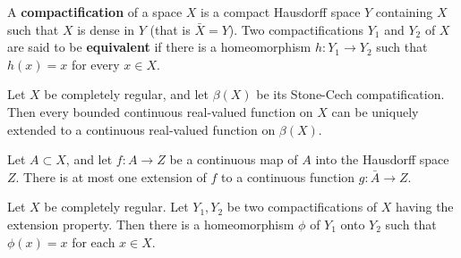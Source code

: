   \begin{definition}
    A \textbf{compactification} of a space $X$ is a compact Hausdorff space $Y$ containing $X$ such that $X$ is dense in $Y$ (that is $\bar{X} = Y$). Two compactifications $Y_1$ and $Y_2$ of $X$ are said to be \textbf{equivalent} if there is a homeomorphism $h: Y_1 \longrightarrow Y_2$ such that $h(x) = x$ for every $x \in X$. 
  \end{definition}

  \begin{theorem}
    Let $X$ be completely regular, and let $\beta(X)$ be its Stone-Cech compatification. Then every bounded continuous real-valued function on $X$ can be uniquely extended to a continuous real-valued function on $\beta(X)$. 
  \end{theorem}

  \begin{lemma}
    Let $A \subset X$, and let $f: A \longrightarrow Z$ be a continuous map of $A$ into the Hausdorff space $Z$. There is at most one extension of $f$ to a continuous function $g: \bar{A} \longrightarrow Z$. 
  \end{lemma}

  \begin{theorem}
    Let $X$ be completely regular. Let $Y_1, Y_2$ be two compactifications of $X$ having the extension property. Then there is a homeomorphism $\phi$ of $Y_1$ onto $Y_2$ such that $\phi(x) = x$ for each $x \in X$. 
  \end{theorem}

